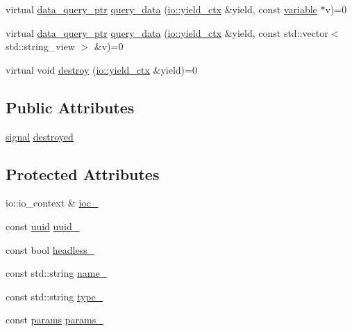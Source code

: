 \begin{DoxyCompactItemize}
\item 
virtual \hyperlink{namespacetelegraph_a6ffe775ac48dca2a4013b53d692199c8}{data\+\_\+query\+\_\+ptr} \hyperlink{classtelegraph_1_1context_a301114c9b73194507ae58221566a3e57}{query\+\_\+data} (\hyperlink{structboost_1_1asio_1_1yield__ctx}{io\+::yield\+\_\+ctx} \&yield, const \hyperlink{classtelegraph_1_1variable}{variable} $\ast$v)=0
\item 
virtual \hyperlink{namespacetelegraph_a6ffe775ac48dca2a4013b53d692199c8}{data\+\_\+query\+\_\+ptr} \hyperlink{classtelegraph_1_1context_a34793623d2a2def580ad0b8710c74c6d}{query\+\_\+data} (\hyperlink{structboost_1_1asio_1_1yield__ctx}{io\+::yield\+\_\+ctx} \&yield, const std\+::vector$<$ std\+::string\+\_\+view $>$ \&v)=0
\item 
virtual void \hyperlink{classtelegraph_1_1context_a4017c1bcd9c84170a5cb612ae45d6fb4}{destroy} (\hyperlink{structboost_1_1asio_1_1yield__ctx}{io\+::yield\+\_\+ctx} \&yield)=0
\end{DoxyCompactItemize}
\subsection*{Public Attributes}
\begin{DoxyCompactItemize}
\item 
\hyperlink{classtelegraph_1_1signal}{signal} \hyperlink{classtelegraph_1_1context_aeae90cedad8326dcd9d6180d1058a10f}{destroyed}
\end{DoxyCompactItemize}
\subsection*{Protected Attributes}
\begin{DoxyCompactItemize}
\item 
io\+::io\+\_\+context \& \hyperlink{classtelegraph_1_1context_a51949d83373c67e0c9e1050127df30c1}{ioc\+\_\+}
\item 
const \hyperlink{namespacetelegraph_a51ee91d7eaeef067f7ccac2b170e5d59}{uuid} \hyperlink{classtelegraph_1_1context_a0bf1873b5a611776d48b3e854e9e3589}{uuid\+\_\+}
\item 
const bool \hyperlink{classtelegraph_1_1context_a5053f72fe2b58e264a0ce00de2727953}{headless\+\_\+}
\item 
const std\+::string \hyperlink{classtelegraph_1_1context_a19b7cc6a4c3cf53d79e07fc78573fc31}{name\+\_\+}
\item 
const std\+::string \hyperlink{classtelegraph_1_1context_af1cab34ed3278340157e25d828bb6c77}{type\+\_\+}
\item 
const \hyperlink{classtelegraph_1_1params}{params} \hyperlink{classtelegraph_1_1context_aa80ae462af488940258d71ccb6435b33}{params\+\_\+}
\end{DoxyCompactItemize}


